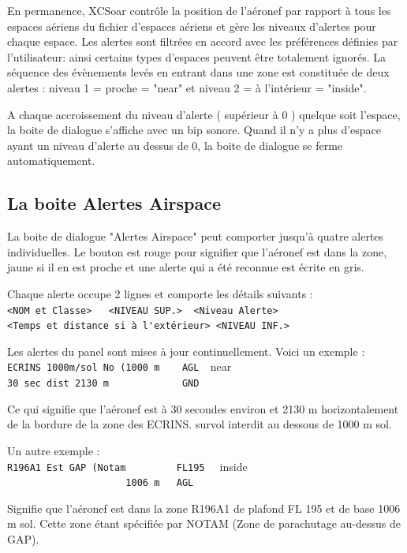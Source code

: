 En permanence, XCSoar contrôle la position de l'aéronef par rapport à tous les espaces aériens du fichier d'espaces aériens et gère les niveaux d'alertes pour chaque espace. Les alertes sont filtrées en accord avec les préférences définies par l'utilisateur: ainsi certains types d'espaces peuvent être totalement ignorés.
La séquence des évènements levés en entrant dans une zone est constituée de deux alertes : niveau 1 = proche = "near" et niveau 2 = à l'intérieur = "inside".

A chaque accroissement du niveau d'alerte ( supérieur à 0 ) quelque soit l'espace, la boite de dialogue s'affiche avec un bip sonore. Quand il n'y a plus d'espace ayant un niveau d'alerte au dessus de 0, la boite de dialogue se ferme automatiquement.

\subsection*{La boite Alertes Airspace}

La boite de dialogue "Alertes Airspace" peut comporter jusqu'à quatre alertes individuelles. Le bouton est rouge pour signifier que l'aéronef est dans la zone, jaune si il en est proche et une alerte qui a été reconnue est écrite en gris.

Chaque alerte occupe 2 lignes et comporte les détails suivants :\\
\verb+<NOM et Classe>   <NIVEAU SUP.>  <Niveau Alerte>+  \\
\verb+<Temps et distance si à l'extérieur> <NIVEAU INF.>+

Les alertes du panel sont mises à jour continuellement.
Voici un exemple :\\
\verb+ECRINS 1000m/sol No (1000 m    AGL  +\colorbox{AirspaceYellow}{near} \\
\verb+30 sec dist 2130 m             GND+

Ce qui signifie que l'aéronef est à 30 secondes environ et 2130 m horizontalement de la bordure de la zone des ECRINS. survol interdit au dessous de 1000 m sol.

Un autre exemple :\\
\verb+R196A1 Est GAP (Notam         FL195  + \colorbox{AirspaceRed}{inside}  \\
\verb+                     1006 m   AGL+

Signifie que l'aéronef est dans la zone R196A1 de plafond FL 195 et de base 1006 m sol. Cette zone étant spécifiée par NOTAM (Zone de parachutage au-dessus de GAP).


